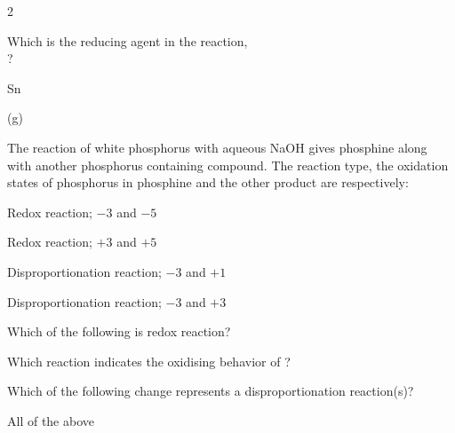 \documentclass[10pt,a4paper]{article}
\begin{document}
\begin{multicols}{2}
\begin{questions}
\item Which is the reducing agent in the reaction,\\
?
\begin{options}
  \item Sn
  \item {}
  \item {}
  \item {}(g)
\end{options}

\item The reaction of white phosphorus with aqueous NaOH gives phosphine along with another phosphorus containing compound. The reaction type, the oxidation states of phosphorus in phosphine and the other product are respectively:
\begin{options}
  \item Redox reaction; $-3$ and $-5$
  \item Redox reaction; $+3$ and $+5$
  \item Disproportionation reaction; $-3$ and $+1$
  \item Disproportionation reaction; $-3$ and $+3$
\end{options}

\item Which of the following is redox reaction?
\begin{options}
  \item {}
  \item {}
  \item {}
  \item {}
\end{options}

\item Which reaction indicates the oxidising behavior of ?
\begin{options}
  \item {}
  \item {}
  \item {}
  \item {}
\end{options}

\item Which of the following change represents a disproportionation reaction(s)?
\begin{options}
  \item {}
  \item {}
  \item {}
  \item All of the above
\end{options}


\end{questions}
\end{multicols}
\end{document}
